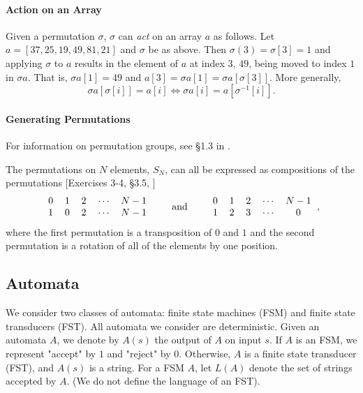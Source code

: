 \documentclass{llncs}
\begin{document}
\paragraph{Action on an Array}

Given a permutation \(\sigma\), \(\sigma\) can {\it act} on an array \(a\) as follows.  Let \(a = [37, 25, 19, 49, 81, 21]\) and \(\sigma\) be as above.  Then \(\sigma(3) = \sigma[3] = 1\) and applying \(\sigma\) to \(a\) results in the element of \(a\) at index \(3\), \(49\), being moved to index \(1\) in \(\sigma a\).  That is, \(\sigma a[1] = 49\) and \(a[3] = \sigma a[1] = \sigma a[\sigma[3]]\).  More generally,
\begin{equation}
\sigma a[\sigma[i]] = a[i] \Longleftrightarrow \sigma a[i] = a[\sigma^{-1}[i]].
\label{action}
\end{equation}

\paragraph{Generating Permutations}
For information on permutation groups, see \S1.3 in \cite{dummitfoote}.

\makeatletter
\renewcommand{\@cite}[1]{#1}
\makeatother
The permutations on \(N\) elements, \(S_{N}\), can all be expressed as compositions of the permutations [Exercises 3-4, \S3.5, \cite{dummitfoote}]
\[\begin{tabular}{ccccc}
0 & 1 & 2 & \(\dotsm\) & \(N-1\)\\
1 & 0 & 2 & \(\dotsm\) & \(N-1\)
\end{tabular}
\qquad\textrm{and}\qquad
\begin{tabular}{ccccc}
0 & 1 & 2 & \(\dotsm\) & \(N-1\)\\
1 & 2 & 3 & \(\dotsm\) & 0
\end{tabular},\]
\makeatletter
\renewcommand{\@cite}[1]{[#1]}
\makeatother
where the first permutation is a transposition of \(0\) and \(1\) and the second permutation is a rotation of all of the elements by one position.

\subsection{Automata}
We consider two classes of automata: finite state machines (FSM) and finite state transducers (FST). All automata we consider are deterministic. Given an automata $A$, we denote by $A(s)$ the output of $A$ on input $s$. If $A$ is an FSM, we represent "accept" by $1$ and "reject" by $0$. Otherwise, $A$ is a finite state transducer (FST), and $A(s)$ is a string. For a FSM $A$, let $L(A)$ denote the set of strings accepted by $A$. (We do not define the language of an FST).
\end{document}
